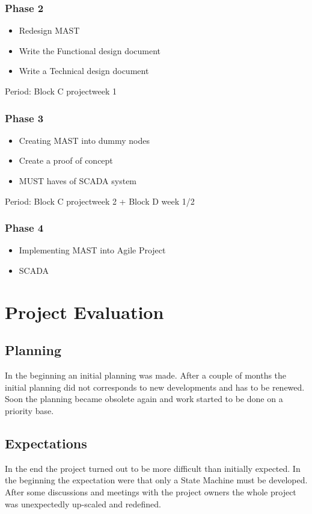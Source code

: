 \documentclass[12pt,a4paper]{report}
\begin{document}
\subsubsection{Phase 2}
\begin{itemize}
\item Redesign MAST
\item Write the Functional design document
\item Write a Technical design document
\end{itemize}
Period: Block C projectweek 1

\subsubsection{Phase 3}
\begin{itemize}
\item Creating MAST into dummy nodes
\item Create a proof of concept
\item MUST haves of SCADA system
\end{itemize}
Period: Block C projectweek 2 + Block D week 1/2

\subsubsection{Phase 4}
\begin{itemize}
\item Implementing MAST into Agile Project
\item SCADA
\end{itemize}

\newpage
\section{Project Evaluation}
\subsection{Planning}
In the beginning an initial planning was made. 
After a couple of months the initial planning did not corresponds to new developments and has to be renewed.
Soon the planning became obsolete again and work started to be done on a priority base.

\subsection{Expectations}
In the end the project turned out to be more difficult than initially expected.
In the beginning the expectation were that only a State Machine must be developed.
After some discussions and meetings with the project owners the whole project was unexpectedly up-scaled and redefined.
\end{document}
